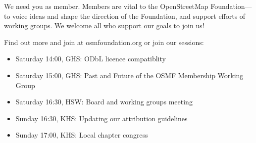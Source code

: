 \begin{landscape}
{    We need you as member. Members are vital
    to the OpenStreetMap Foundation---to voice ideas
    and shape the direction of the Foundation,
    and support efforts of working groups. We
    welcome all who support our goals to join us!
    
    Find out more and join at osmfoundation.org
    or join our sessions:
    \begin{itemize}
      \RaggedRight
      \setlength{\itemsep}{-3pt} %
      \item Saturday 14:00, GHS: ODbL licence compatiblity
      \item Saturday 15:00, GHS: Past and Future of the OSMF Membership Working Group
      \item Saturday 16:30, HSW: Board and working groups meeting
      \item Sunday 16:30, KHS: Updating our attribution guidelines
      \item Sunday 17:00, KHS: Local chapter congress
    \end{itemize}
    \justifying
  }%


  \setlength{\fboxsep}{4.5pt}%
  \vspace{1\baselineskip}
  \noindent%
  \setlength{\fboxsep}{3pt}

\end{landscape}

\newpage
